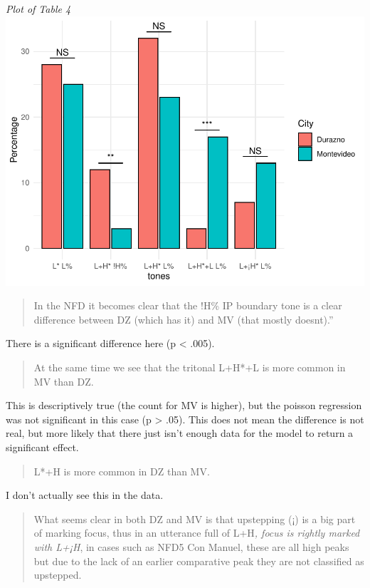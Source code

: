 \documentclass[
  man]{apa6}
\begin{document}
\emph{Plot of Table 4}
\includegraphics{main_files/figure-latex/unnamed-chunk-8-1.pdf}

\begin{quote}
In the NFD it becomes clear that the !H\% IP boundary tone is a clear difference between DZ (which has it) and MV (that mostly doesnt).''
\end{quote}

There is a significant difference here (p \textless{} .005).

\begin{quote}
At the same time we see that the tritonal L+H*+L is more common in MV than DZ.
\end{quote}

This is descriptively true (the count for MV is higher), but the poisson regression was not significant in this case (p \textgreater{} .05). This does not mean the difference is not real, but more likely that there just isn't enough data for the model to return a significant effect.

\begin{quote}
L*+H is more common in DZ than MV.
\end{quote}

I don't actually see this in the data.

\begin{quote}
What seems clear in both DZ and MV is that upstepping (¡) is a big part of marking focus, thus in an utterance full of L+H\emph{, focus is rightly marked with L+¡H}, in cases such as NFD5 Con Manuel, these are all high peaks but due to the lack of an earlier comparative peak they are not classified as upstepped.
\end{quote}
\end{document}
